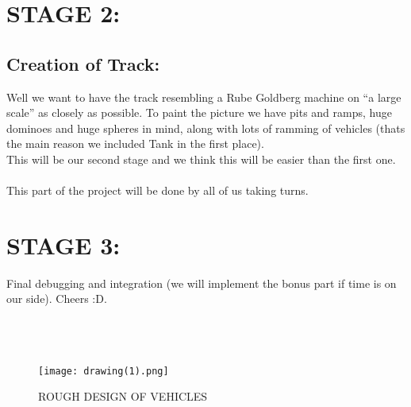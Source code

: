 \documentclass[a4paper,11pt]{article}
\begin{document}
\section{STAGE 2:}

\subsection{Creation of Track:}
Well we want to have the track resembling  a Rube Goldberg machine on “a large scale” as closely as possible. To paint the picture we have pits and ramps, huge dominoes and huge spheres in mind, along with lots of ramming of vehicles (thats the main reason we included Tank in the first place).\\
This will be our second stage and we think this will be easier than the first one.\\
\\
This part of the project will be done by all of us taking turns.\\


\section{STAGE 3:}

Final debugging and integration (we will implement the bonus part if time is on our side). Cheers :D.
\\ \\
\\ \\

\begin{figure}[h]
\centering
\texttt{[image: drawing(1).png]}
\caption{ROUGH DESIGN OF VEHICLES}
\end{figure}
\end{document}
